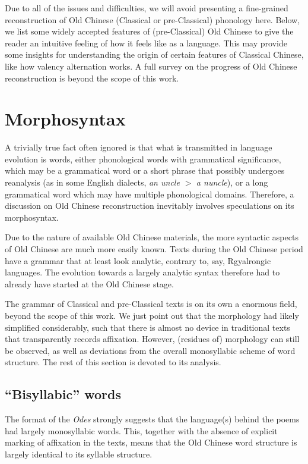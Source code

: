 \documentclass[UTF8, a4paper, oneside, scheme=plain, 12pt]{ctexrep}
\newcommand*{\textgt}{$>$ }
\newcommand{\form}[1]{\emph{#1}}
\newcommand{\work}[1]{\textit{#1}}
\begin{document}
Due to all of the issues and difficulties, we will avoid presenting a fine-grained reconstruction of
Old Chinese (Classical or pre-Classical) phonology here.
Below, we list some widely accepted features of (pre-Classical) Old Chinese
to give the reader an intuitive feeling of how it feels like as a language.
This may provide some insights for understanding the origin of certain features of Classical Chinese, like how valency alternation works.
A full survey on the progress of Old Chinese reconstruction is beyond the scope of this work.

\section{Morphosyntax}

A trivially true fact often ignored is that what is transmitted in language evolution is words,
either phonological words with grammatical significance,
which may be a grammatical word or a short phrase that possibly undergoes reanalysis 
(as in some English dialects, \form{an uncle} \textgt \form{a nuncle}),
or a long grammatical word which may have multiple phonological domains.
Therefore, a discussion on Old Chinese reconstruction inevitably involves speculations on its morphosyntax.

Due to the nature of available Old Chinese materials,
the more syntactic aspects of Old Chinese are much more easily known.
Texts during the Old Chinese period have a grammar that at least look analytic,
contrary to, say, Rgyalrongic languages.
The evolution towards a largely analytic syntax therefore had to already have started at the Old Chinese stage.

The grammar of Classical and pre-Classical texts is on its own a enormous field, beyond the scope of this work.
We just point out that the morphology had likely simplified considerably,
such that there is almost no device in traditional texts that transparently records affixation.
However, (residues of) morphology can still be observed, as well as deviations from the overall monosyllabic scheme of word structure. 
The rest of this section is devoted to its analysis.

\subsection{``Bisyllabic'' words}\label{sec:intro.reconstruction.minor-syllables}

The format of the \work{Odes} strongly suggests that
the language(s) behind the poems had largely monosyllabic words.
This, together with the absence of explicit marking of affixation in the texts,
means that the Old Chinese word structure is largely identical to its syllable structure.
\end{document}
